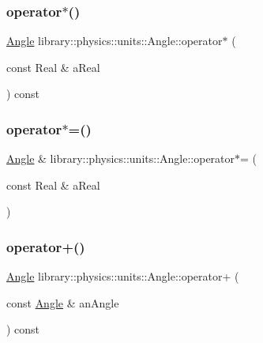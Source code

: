 \subsubsection{\texorpdfstring{operator$\ast$()}{operator*()}}
{\footnotesize\ttfamily \hyperlink{classlibrary_1_1physics_1_1units_1_1_angle}{Angle} library\+::physics\+::units\+::\+Angle\+::operator$\ast$ (\begin{DoxyParamCaption}\item[{const Real \&}]{a\+Real }\end{DoxyParamCaption}) const}

\mbox{\label{classlibrary_1_1physics_1_1units_1_1_angle_af14d361f18244d859a3829c40aba6a14}} 
\subsubsection{\texorpdfstring{operator$\ast$=()}{operator*=()}}
{\footnotesize\ttfamily \hyperlink{classlibrary_1_1physics_1_1units_1_1_angle}{Angle} \& library\+::physics\+::units\+::\+Angle\+::operator$\ast$= (\begin{DoxyParamCaption}\item[{const Real \&}]{a\+Real }\end{DoxyParamCaption})}

\mbox{\label{classlibrary_1_1physics_1_1units_1_1_angle_aebf6869b414e02af92a924d561822824}} 
\subsubsection{\texorpdfstring{operator+()}{operator+()}}
{\footnotesize\ttfamily \hyperlink{classlibrary_1_1physics_1_1units_1_1_angle}{Angle} library\+::physics\+::units\+::\+Angle\+::operator+ (\begin{DoxyParamCaption}\item[{const \hyperlink{classlibrary_1_1physics_1_1units_1_1_angle}{Angle} \&}]{an\+Angle }\end{DoxyParamCaption}) const}

